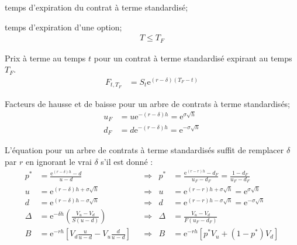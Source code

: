 \documentclass[10pt, french]{article}
\begin{document}
\begin{multicols*}{2}
\begin{distributions}[Notation]
\begin{description}[leftmargin = *]
	\item[$T_{F}$]	temps d'expiration du contrat à terme standardisé;
	\item[$T$]	temps d'expiration d'une option;
		\begin{align*}
		T \le T_{F}
		\end{align*}
	\item[$F_{t, T_{F}}$]	Prix à terme au temps $t$ pour un contrat à terme standardisé expirant au temps $T_{F}$.
		\begin{align*}
		F_{t, T_{F}}
		&=	S_{t} \textrm{e}^{(r - \delta)(T_{F} - t)}
		\end{align*}
	\item[$u_{F}$ et $d_{F}$]	Facteurs de hausse et de baisse pour un arbre de contrats à terme standardisés;
		\begin{align*}
		u_{F}	
		&=	u \textrm{e}^{-(r - \delta)h}	=	\textrm{e}^{\sigma \sqrt{h}}	\\
		d_{F}
		&=	d \textrm{e}^{-(r - \delta)h}	=	\textrm{e}^{-\sigma \sqrt{h}}
		\end{align*}
\end{description}
\end{distributions}

L'équation pour un arbre de contrats à terme standardisés suffit de remplacer $\delta$ par $r$ en ignorant le vrai $\delta$ s'il est donné :
\begin{align*}
	p^{*}	
		&=	\frac{\textrm{e}^{(r - \delta)h} - d}{u - d}	&
	&\Rightarrow	&
	p^{*}	
		&=	\frac{\textrm{e}^{(r -r)h} - d_{F}}{u_{F} - d_{F}}
		=	\frac{1 - d_{F}}{u_{F} - d_{F}}	\\
	u	
		&=	\textrm{e}^{(r - \delta)h + \sigma \sqrt{h}}	&
	&\Rightarrow	&
	u	
		&=	\textrm{e}^{(r - r)h + \sigma \sqrt{h}}	
		=	\textrm{e}^{\sigma \sqrt{h}}	\\
	d	
		&=	\textrm{e}^{(r - \delta)h - \sigma \sqrt{h}}	&
	&\Rightarrow	&
	d	
		&=	\textrm{e}^{(r - r)h - \sigma \sqrt{h}}	
		=	\textrm{e}^{-\sigma \sqrt{h}}	\\
	\Delta
		&=	\textrm{e}^{-\delta h} \left(\frac{V_{u} - V_{d}}{S(u - d)}\right)	&
	&\Rightarrow	&
	\Delta
		&=	\frac{V_{u} - V_{d}}{F(u_{F} - d_{F})}	\\
	B	
		&=	\textrm{e}^{-rh} \left[V_{d} \frac{u}{u - d} - V_{u}\frac{d}{u - d}\right]	&
	&\Rightarrow	&
	B
		&=	\textrm{e}^{-rh} [p^{*} V_{u} + (1 - p^{*}) V_{d}]
\end{align*}


\end{multicols*}
\end{document}
